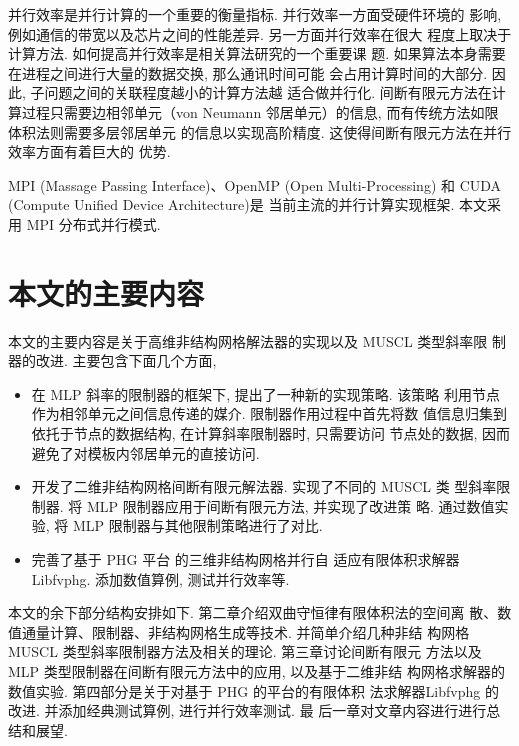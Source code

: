 并行效率是并行计算的一个重要的衡量指标. 并行效率一方面受硬件环境的
影响, 例如通信的带宽以及芯片之间的性能差异. 另一方面并行效率在很大
程度上取决于计算方法. 如何提高并行效率是相关算法研究的一个重要课
题. 如果算法本身需要在进程之间进行大量的数据交换, 那么通讯时间可能
会占用计算时间的大部分. 因此, 子问题之间的关联程度越小的计算方法越
适合做并行化. 间断有限元方法在计算过程只需要边相邻单元（von
Neumann 邻居单元）的信息, 而有传统方法如限体积法则需要多层邻居单元
的信息以实现高阶精度. 这使得间断有限元方法在并行效率方面有着巨大的
优势.

MPI (Massage Passing Interface)、OpenMP (Open
Multi-Processing) 和 CUDA (Compute Unified Device Architecture)是
当前主流的并行计算实现框架. 本文采用 MPI 分布式并行模式.

\section{本文的主要内容}
\label{sec:main-containt}

本文的主要内容是关于高维非结构网格解法器的实现以及 MUSCL 类型斜率限
制器的改进. 主要包含下面几个方面,
\begin{itemize}
\item 在 MLP 斜率的限制器的框架下, 提出了一种新的实现策略. 该策略
  利用节点作为相邻单元之间信息传递的媒介. 限制器作用过程中首先将数
  值信息归集到依托于节点的数据结构, 在计算斜率限制器时, 只需要访问
  节点处的数据, 因而避免了对模板内邻居单元的直接访问.
\item 开发了二维非结构网格间断有限元解法器. 实现了不同的 MUSCL 类
  型斜率限制器. 将 MLP 限制器应用于间断有限元方法, 并实现了改进策
  略. 通过数值实验, 将 MLP 限制器与其他限制策略进行了对比.
\item 完善了基于 PHG 平台 \cite{Zhang2009} 的三维非结构网格并行自
  适应有限体积求解器 Libfvphg. 添加数值算例, 测试并行效率等.
\end{itemize}

本文的余下部分结构安排如下. 第二章介绍双曲守恒律有限体积法的空间离
散、数值通量计算、限制器、非结构网格生成等技术. 并简单介绍几种非结
构网格 MUSCL 类型斜率限制器方法及相关的理论. 第三章讨论间断有限元
方法以及 MLP 类型限制器在间断有限元方法中的应用, 以及基于二维非结
构网格求解器的数值实验. 第四部分是关于对基于 PHG 的平台的有限体积
法求解器Libfvphg 的改进. 并添加经典测试算例, 进行并行效率测试. 最
后一章对文章内容进行进行总结和展望.

